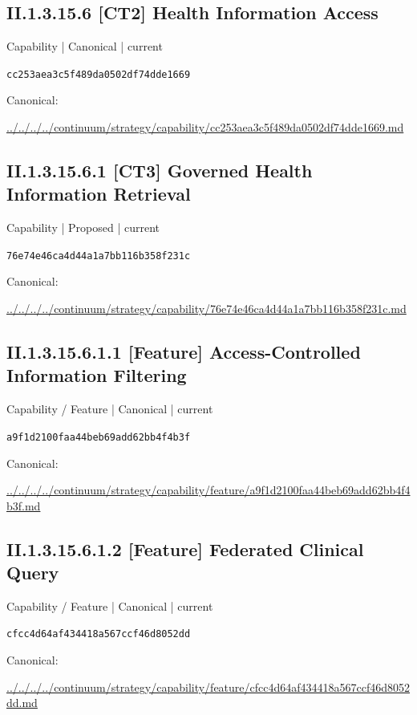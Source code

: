 \documentclass[10pt,a4paper]{article}
\begin{document}
\subsection*{II.1.3.15.6 [CT2] Health Information Access}
{\small Capability | Canonical | current}\par
\texttt{cc253aea3c5f489da0502df74dde1669}\par
Canonical: \par
{\footnotesize\url{../../../../continuum/strategy/capability/cc253aea3c5f489da0502df74dde1669.md}}\par
\subsection*{II.1.3.15.6.1 [CT3] Governed Health Information Retrieval}
{\small Capability | Proposed | current}\par
\texttt{76e74e46ca4d44a1a7bb116b358f231c}\par
Canonical: \par
{\footnotesize\url{../../../../continuum/strategy/capability/76e74e46ca4d44a1a7bb116b358f231c.md}}\par
\subsection*{II.1.3.15.6.1.1 [Feature] Access-Controlled Information Filtering}
{\small Capability / Feature | Canonical | current}\par
\texttt{a9f1d2100faa44beb69add62bb4f4b3f}\par
Canonical: \par
{\footnotesize\url{../../../../continuum/strategy/capability/feature/a9f1d2100faa44beb69add62bb4f4b3f.md}}\par
\subsection*{II.1.3.15.6.1.2 [Feature] Federated Clinical Query}
{\small Capability / Feature | Canonical | current}\par
\texttt{cfcc4d64af434418a567ccf46d8052dd}\par
Canonical: \par
{\footnotesize\url{../../../../continuum/strategy/capability/feature/cfcc4d64af434418a567ccf46d8052dd.md}}\par
\end{document}
